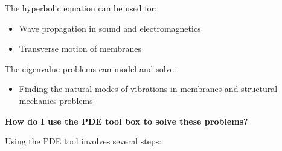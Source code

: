 \documentclass{amsart}
\theoremstyle{definition}
\begin{document}
The hyperbolic equation can be used for:
\begin{itemize}
\item Wave propagation in sound and electromagnetics
\item Transverse motion of membranes
\end{itemize}

The eigenvalue problems can model and solve:
\begin{itemize}
\item Finding the natural modes of vibrations in membranes and structural mechanics problems
\end{itemize}

\par
\bigskip
\noindent
\Large
\textbf{How do I use the PDE tool box to solve these problems?} \par
\normalsize
Using the PDE tool involves several steps:
\end{document}
